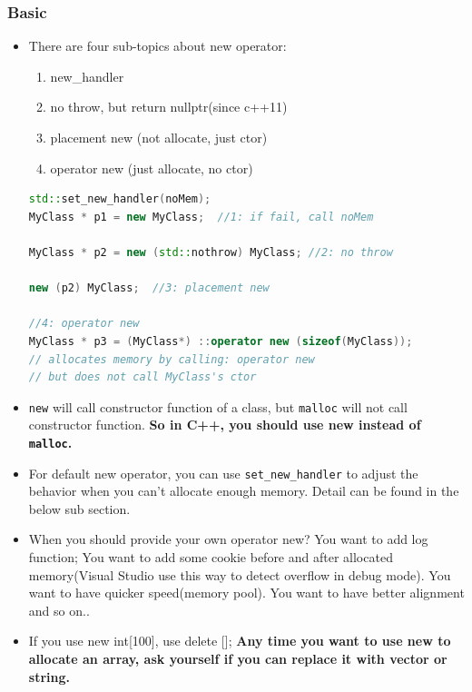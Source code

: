 \documentclass[a4paper,12pt,twoside]{book}
\begin{document}
\subsubsection{Basic}
\begin{itemize}
	
	\item There are four sub-topics about new operator:
	\begin{enumerate}
		\item new\_handler
		\item no throw, but return nullptr(since c++11)
		\item placement new (not allocate, just ctor)
		\item operator new (just allocate, no ctor)
	\end{enumerate}
	
\begin{lstlisting}[frame=single, language=c++]
std::set_new_handler(noMem);
MyClass * p1 = new MyClass;  //1: if fail, call noMem
	
MyClass * p2 = new (std::nothrow) MyClass; //2: no throw
	
new (p2) MyClass;  //3: placement new
	
//4: operator new
MyClass * p3 = (MyClass*) ::operator new (sizeof(MyClass));
// allocates memory by calling: operator new
// but does not call MyClass's ctor
\end{lstlisting}
	
	\item \texttt{new} will call constructor function of a class, but \texttt{malloc} will not call constructor function.  \textbf{So in C++, you should use new instead of \texttt{malloc}.}
	
	\item For default new operator, you can use \texttt{set\_new\_handler} to adjust the behavior when you can't allocate enough memory. Detail can be found in the below sub section.
	
	\item When you should provide your own operator new?  You want to add log function; You want to add some cookie before and after allocated memory(Visual Studio use this way to detect overflow in debug mode). You want to have quicker speed(memory pool). You want to have better alignment and so on..
	
	\item If you use new int[100], use delete [];  \textbf{Any time you want to use new to allocate an array, ask yourself if you can replace it with vector or string.}
\end{itemize}
\end{document}
